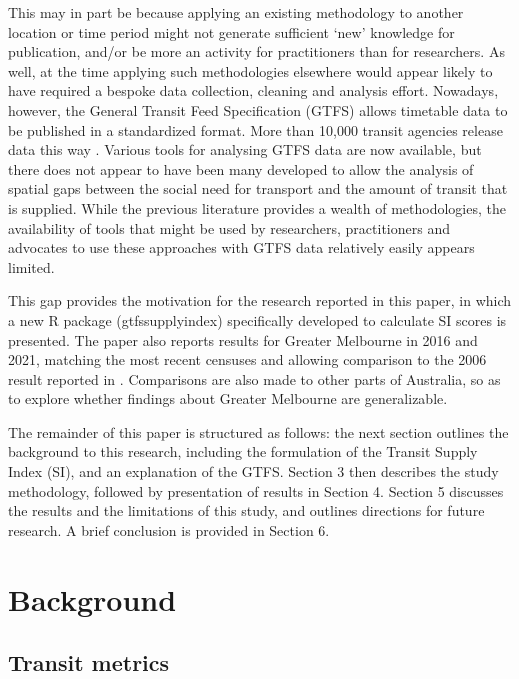\documentclass[preprint, 3p,
authoryear]{elsarticle} %
\begin{document}
This may in part be because applying an existing methodology to another
location or time period might not generate sufficient `new' knowledge
for publication, and/or be more an activity for practitioners than for
researchers. As well, at the time applying such methodologies elsewhere
would appear likely to have required a bespoke data collection, cleaning
and analysis effort. Nowadays, however, the General Transit Feed
Specification (GTFS) allows timetable data to be published in a
standardized format. More than 10,000 transit agencies release data this
way \citep{GTFS}. Various tools for analysing GTFS data are now
available, but there does not appear to have been many developed to
allow the analysis of spatial gaps between the social need for transport
and the amount of transit that is supplied. While the previous
literature provides a wealth of methodologies, the availability of tools
that might be used by researchers, practitioners and advocates to use
these approaches with GTFS data relatively easily appears limited.

This gap provides the motivation for the research reported in this
paper, in which a new R package (gtfssupplyindex) specifically developed
to calculate SI scores is presented. The paper also reports results for
Greater Melbourne in 2016 and 2021, matching the most recent censuses
and allowing comparison to the 2006 result reported in
\citet{currie2010identifying}. Comparisons are also made to other parts
of Australia, so as to explore whether findings about Greater Melbourne
are generalizable.

The remainder of this paper is structured as follows: the next section
outlines the background to this research, including the formulation of
the Transit Supply Index (SI), and an explanation of the GTFS. Section 3
then describes the study methodology, followed by presentation of
results in Section 4. Section 5 discusses the results and the
limitations of this study, and outlines directions for future research.
A brief conclusion is provided in Section 6.

\section{Background}\label{background}

\subsection{Transit metrics}\label{transit-metrics}
\end{document}

